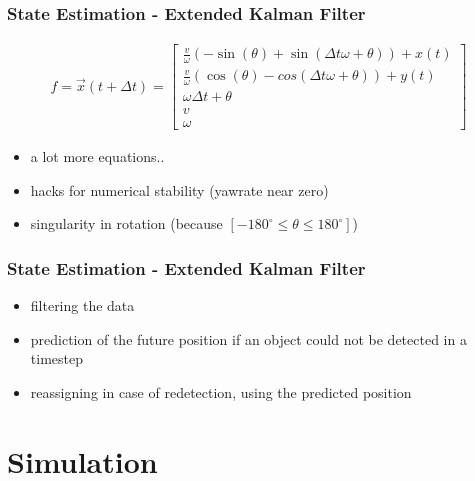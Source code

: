 \documentclass[nosymbols]{beamer}	%
\begin{document}
\begin{frame}
\frametitle{State Estimation - Extended Kalman Filter}
\begin{align*}
f = \vec{x}(t + \Delta t)=
\begin{bmatrix}
\frac{v}{\omega} (-\sin(\theta) + \sin(\Delta t \omega + \theta)) + x(t) \\
\frac{v}{\omega} (\cos(\theta) - cos(\Delta t \omega + \theta)) + y(t) \\
\omega \Delta t + \theta\\
v\\
\omega
\end{bmatrix} 
\end{align*}
\begin{itemize}
\item a lot more equations..
\item hacks for numerical stability (yawrate near zero)
\item singularity in rotation (because $[- 180^{\circ} \le \theta \le 180^{\circ}] $)
\end{itemize}

\end{frame}


\begin{frame}
\frametitle{State Estimation - Extended Kalman Filter}

\begin{itemize}
\item filtering the data
\item prediction of the future position if an object could not be detected in a timestep
\item reassigning in case of redetection, using the predicted position
\end{itemize}


\end{frame}

\section{Simulation}
\end{document}
